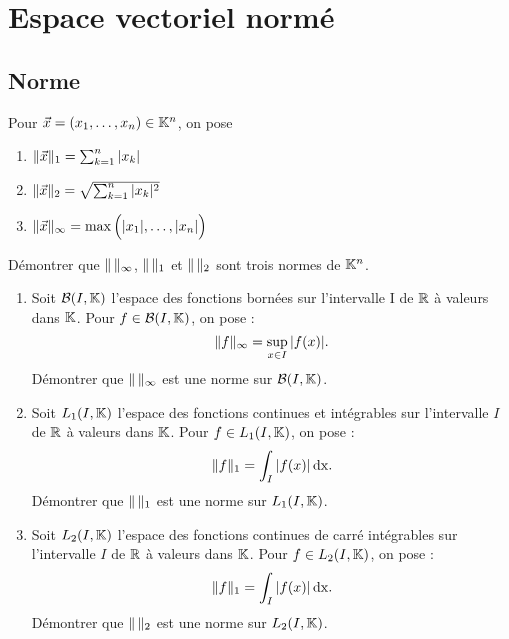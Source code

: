 \documentclass{book}
\begin{document}
\section{Espace vectoriel normé}
\subsection{Norme}
\begin{Exercice}
Pour $\vec{x} =(x_1,\dots,x_n)\in \mathbb{K}^n$, on pose
\begin{enumerate}
\item $\mathopen\lVert \vec{x} \mathclose\rVert_1 = \sum_{k=1}^n |x_k|$
\item $\mathopen\lVert \vec{x} \mathclose\rVert_2 = \sqrt{\sum_{k=1}^n |x_k|^2}$
\item $\mathopen\lVert \vec{x} \mathclose\rVert_\infty = \max\Big(|x_1|,\dots,|x_n|\Big)$
\end{enumerate}
Démontrer que $\mathopen\lVert \, \mathclose\rVert_\infty$, $\mathopen\lVert \, \mathclose\rVert_1$ et $\mathopen\lVert \, \mathclose\rVert_2$ sont trois normes de $\mathbb{K}^n$.
\end{Exercice}
\begin{Exercice}
\begin{enumerate}
\item Soit $\mathcal{B}(I, \mathbb{K})$ l'espace des fonctions bornées sur l'intervalle I de $\mathbb{R}$ à valeurs dans $\mathbb{K}$.  Pour $f \in  \mathcal{B}(I, \mathbb{K})$, on pose :
$$\mathopen\lVert f \mathclose\rVert_\infty=\sup_{x\in I}|f(x)|.$$
Démontrer que $\mathopen\lVert \, \mathclose\rVert_\infty$ est une norme sur $\mathcal{B}(I, \mathbb{K})$.
\item Soit $L_1(I, \mathbb{K})$ l'espace des fonctions continues et intégrables sur l'intervalle $I$ de $\mathbb{R}$ à valeurs dans $\mathbb{K}$. Pour $f \in L_1(I, \mathbb{K})$, on pose :
$$\mathopen\lVert f \mathclose\rVert_1=\int_I|f(x)|\,\mathrm{dx}.$$
Démontrer que  $\mathopen\lVert \, \mathclose\rVert_1$ est une norme sur $L_1(I, \mathbb{K})$.
\item Soit $L_2(I, \mathbb{K})$ l'espace des fonctions continues de carré intégrables sur l'intervalle $I$ de $\mathbb{R}$ à valeurs dans $\mathbb{K}$. Pour $f \in L_2(I, \mathbb{K})$, on pose :
$$\mathopen\lVert f \mathclose\rVert_1=\int_I|f(x)|\,\mathrm{dx}.$$
Démontrer que  $\mathopen\lVert \, \mathclose\rVert_2$ est une norme sur $L_2(I, \mathbb{K})$.
\end{enumerate}
\end{Exercice}
\end{document}
